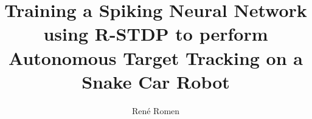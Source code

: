 \usepackage[utf8]{inputenc}
\usepackage{packages}
\usepackage{beamermods}


\author[R. Romen]{Ren\'e Romen}
\title[Bachelor Thesis]{Training a Spiking Neural Network using R-STDP to perform Autonomous Target Tracking on a Snake Car Robot}




\usepackage{pgfpages}
\usepackage{ifthen}
\newif\ifsolution%
